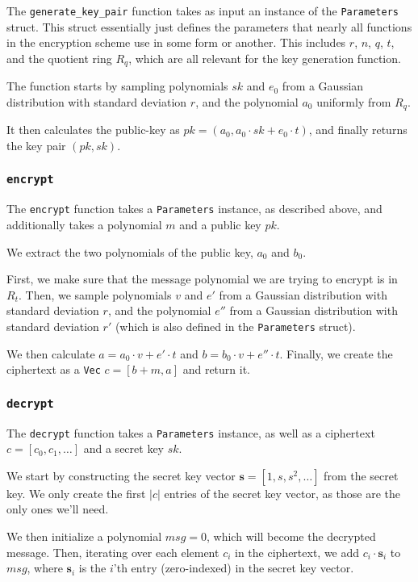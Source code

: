 \documentclass[../main.tex]{subfiles}
\begin{document}
The \lstinline{generate_key_pair} function takes as input an instance of the \lstinline{Parameters} struct.
This struct essentially just defines the parameters that nearly all functions in the encryption scheme use in some form or another.
This includes $r$, $n$, $q$, $t$, and the quotient ring $R_q$, which are all relevant for the key generation function.

The function starts by sampling polynomials $sk$ and $e_0$ from a Gaussian distribution with standard deviation $r$, and the polynomial $a_0$ uniformly from $R_q$.

It then calculates the public-key as $pk = (a_0, a_0 \cdot sk + e_0 \cdot t)$, and finally returns the key pair $(pk, sk)$.

\subsubsection{\lstinline{encrypt}}

The \lstinline{encrypt} function takes a \lstinline{Parameters} instance, as described above, and additionally takes a polynomial $m$ and a public key $pk$.

We extract the two polynomials of the public key, $a_0$ and $b_0$.

First, we make sure that the message polynomial we are trying to encrypt is in $R_t$.
Then, we sample polynomials $v$ and $e'$ from a Gaussian distribution with standard deviation $r$, and the polynomial $e''$ from a Gaussian distribution with standard deviation $r'$ (which is also defined in the \lstinline{Parameters} struct).

We then calculate $a = a_0 \cdot v + e' \cdot t$ and $b = b_0 \cdot v + e'' \cdot t$.
Finally, we create the ciphertext as a \lstinline{Vec} $c = [b + m, a]$ and return it.

\subsubsection{\lstinline{decrypt}}

The \lstinline{decrypt} function takes a \lstinline{Parameters} instance, as well as a ciphertext $c = [c_0, c_1, \dots]$ and a secret key $sk$.

We start by constructing the secret key vector $\mathbf{s} = [1, s, s^2, \dots]$ from the secret key.
We only create the first $|c|$ entries of the secret key vector, as those are the only ones we'll need.

We then initialize a polynomial $msg = 0$, which will become the decrypted message.
Then, iterating over each element $c_i$ in the ciphertext, we add $c_i \cdot \mathbf{s}_i$ to $msg$, where $\mathbf{s}_i$ is the $i$'th entry (zero-indexed) in the secret key vector.
\end{document}
